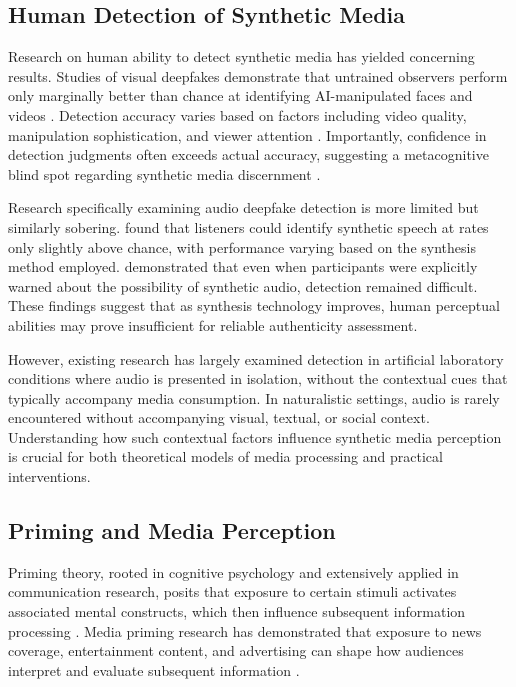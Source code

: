 \documentclass[12pt, a4paper]{article}
\begin{document}
\subsection{Human Detection of Synthetic Media}

Research on human ability to detect synthetic media has yielded concerning results. Studies of visual deepfakes demonstrate that untrained observers perform only marginally better than chance at identifying AI-manipulated faces and videos \citep{rossler2019faceforensics, dolhansky2020deepfake}. Detection accuracy varies based on factors including video quality, manipulation sophistication, and viewer attention \citep{groh2022deepfake}. Importantly, confidence in detection judgments often exceeds actual accuracy, suggesting a metacognitive blind spot regarding synthetic media discernment \citep{nightingale2022ai}.

Research specifically examining audio deepfake detection is more limited but similarly sobering. \citet{muller2022human} found that listeners could identify synthetic speech at rates only slightly above chance, with performance varying based on the synthesis method employed. \citet{blue2022you} demonstrated that even when participants were explicitly warned about the possibility of synthetic audio, detection remained difficult. These findings suggest that as synthesis technology improves, human perceptual abilities may prove insufficient for reliable authenticity assessment.

However, existing research has largely examined detection in artificial laboratory conditions where audio is presented in isolation, without the contextual cues that typically accompany media consumption. In naturalistic settings, audio is rarely encountered without accompanying visual, textual, or social context. Understanding how such contextual factors influence synthetic media perception is crucial for both theoretical models of media processing and practical interventions.

\subsection{Priming and Media Perception}

Priming theory, rooted in cognitive psychology and extensively applied in communication research, posits that exposure to certain stimuli activates associated mental constructs, which then influence subsequent information processing \citep{fiske1991social, roskosewoldsen2007priming}. Media priming research has demonstrated that exposure to news coverage, entertainment content, and advertising can shape how audiences interpret and evaluate subsequent information \citep{scheufele2000agenda, domke2002priming}.
\end{document}
